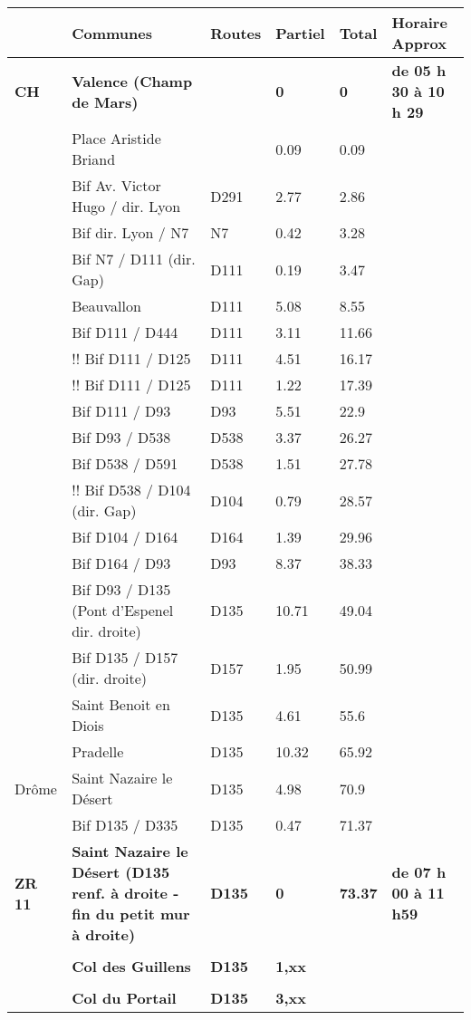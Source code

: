 \documentclass{article}%
\begin{document}
\begin{longtable}{p{2.25cm}|p{7.0cm}|p{1.5cm}|p{1.5cm}|p{1.5cm}|p{3.5cm}}%
\hline%
&Communes&Routes&Partiel&Total&Horaire Approx\\%
\hline%
\endhead%
\endfoot%
\endlastfoot%
\textbf{﻿CH}&\textbf{ Valence (Champ de Mars) }& &\textbf{0}&\textbf{0}&\textbf{de 05 h 30 à 10 h 29}\\%
 &Place Aristide Briand & &0.09&0.09& \\%
 &Bif Av. Victor Hugo / dir. Lyon&D291&2.77&2.86& \\%
 &Bif dir. Lyon / N7&N7 &0.42&3.28& \\%
 &Bif N7 / D111 (dir. Gap)&D111&0.19&3.47& \\%
 &Beauvallon &D111&5.08&8.55& \\%
 &Bif D111 / D444 &D111&3.11&11.66& \\%
 &!! Bif D111 / D125&D111&4.51&16.17& \\%
 &!! Bif D111 / D125&D111&1.22&17.39& \\%
 &Bif D111 / D93&D93&5.51&22.9& \\%
 &Bif D93 / D538&D538&3.37&26.27& \\%
 &Bif D538 / D591 &D538&1.51&27.78& \\%
 &!! Bif D538 / D104 (dir. Gap) &D104&0.79&28.57& \\%
 &Bif D104 / D164 &D164&1.39&29.96& \\%
 &Bif D164 / D93&D93&8.37&38.33& \\%
 &Bif D93 / D135 (Pont d'Espenel dir. droite)&D135 &10.71&49.04& \\%
 &Bif D135 / D157 (dir. droite)&D157&1.95&50.99& \\%
 &Saint Benoit en Diois&D135&4.61&55.6& \\%
 &Pradelle&D135&10.32&65.92& \\%
Drôme &Saint Nazaire le Désert&D135&4.98&70.9& \\%
 &Bif D135 / D335&D135&0.47&71.37& \\%
\textbf{ ZR 11 }&\textbf{Saint Nazaire le Désert (D135 renf. à droite - fin du petit mur à droite)}&\textbf{D135}&\textbf{0}&\textbf{73.37}&\textbf{de 07 h 00 à 11 h59}\\%
 & & & & & \\%
 &\textbf{Col des Guillens}&\textbf{D135}&\textbf{1,xx}& & \\%
 & & & & & \\%
 &\textbf{Col du Portail}&\textbf{D135}&\textbf{3,xx}& & \\%

\end{longtable}
\end{document}
